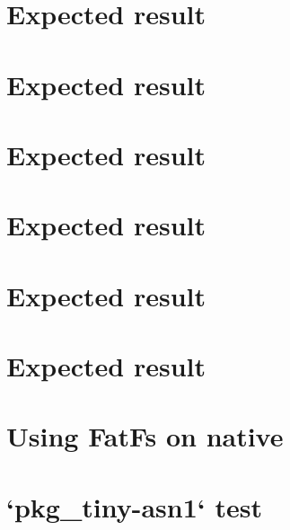 \documentclass[twoside]{book}
\newcommand{\+}{\discretionary{\mbox{\scriptsize$\hookleftarrow$}}{}{}}
\begin{document}
\chapter{Expected result}
\label{md__home_ayush_RIOT_tests_periph_hwrng_README}

\chapter{Expected result}
\label{md__home_ayush_RIOT_tests_periph_i2c_README}

\chapter{Expected result}
\label{md__home_ayush_RIOT_tests_periph_pwm_README}

\chapter{Expected result}
\label{md__home_ayush_RIOT_tests_periph_rtc_README}

\chapter{Expected result}
\label{md__home_ayush_RIOT_tests_periph_rtt_README}

\chapter{Expected result}
\label{md__home_ayush_RIOT_tests_periph_spi_README}

\chapter{Using Fat\+Fs on native}
\label{md__home_ayush_RIOT_tests_pkg_fatfs_README}

\chapter{`pkg\+\_\+tiny-\/asn1` test}
\label{md__home_ayush_RIOT_tests_pkg_tiny-asn1_README}

\end{document}
